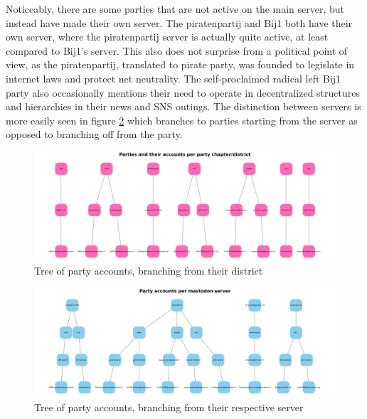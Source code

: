 Noticeably, there are some parties that are not active on the main server, but instead have made their own server.
The piratenpartij and Bij1 both have their own server, where the piratenpartij server is actually quite active, at least compared to Bij1's server.
This also does not surprise from a political point of view, as the piratenpartij, translated to pirate party, was founded to legislate in internet laws and protect net neutrality.
The self-proclaimed radical left Bij1 party also occasionally mentions their need to operate in decentralized structures and hierarchies in their news and SNS outings.
The distinction between servers is more easily seen in figure \ref{fig:servernetwork} which branches to parties starting from the server as opposed to branching off from the party.

\begin{figure}[ht]
  \centering
  \includegraphics[width=\linewidth]{media/chapter.png}
  \caption{Tree of party accounts, branching from their district}
  \label{fig:partynetwork}
\end{figure}

\begin{figure}[ht]
  \centering
  \includegraphics[width=\linewidth]{media/server.png}
  \caption{Tree of party accounts, branching from their respective server}
  \label{fig:servernetwork}
\end{figure}


